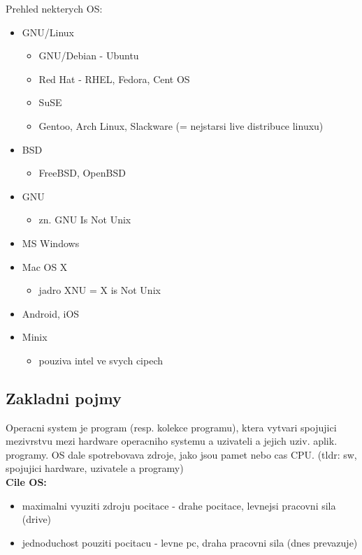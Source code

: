\documentclass[a4paper, 11pt]{article}
\begin{document}
Prehled nekterych OS:
\begin{itemize}
    \item GNU/Linux 
    \begin{itemize}
        \item GNU/Debian - Ubuntu 
        \item Red Hat - RHEL, Fedora, Cent OS 
        \item SuSE 
        \item Gentoo, Arch Linux, Slackware (= nejstarsi live distribuce linuxu) 
    \end{itemize}
    \item BSD 
    \begin{itemize}
        \item FreeBSD, OpenBSD 
    \end{itemize}
    \item GNU
    \begin{itemize}
        \item zn. GNU Is Not Unix
    \end{itemize}
    \item MS Windows 
    \item Mac OS X
    \begin{itemize}
        \item jadro XNU = X is Not Unix
    \end{itemize}
    \item Android, iOS 
    \item Minix
    \begin{itemize}
        \item pouziva intel ve svych cipech \\
    \end{itemize}
\end{itemize}
\newpage

\subsection{Zakladni pojmy}

Operacni system je program (resp. kolekce programu), ktera vytvari spojujici mezivrstvu mezi hardware operacniho systemu  a uzivateli a jejich uziv. aplik. programy. OS dale spotrebovava zdroje, jako jsou pamet nebo cas CPU.
(tldr: sw, spojujici hardware, uzivatele a programy) \\

\noindent\textbf{Cile OS:}
\begin{itemize}
    \item maximalni vyuziti zdroju pocitace - drahe pocitace, levnejsi pracovni sila (drive)
    \item jednoduchost pouziti pocitacu - levne pc, draha pracovni sila (dnes prevazuje) \\
\end{itemize}
\end{document}
